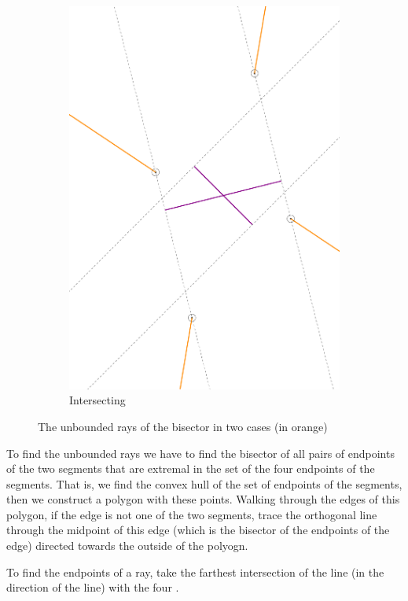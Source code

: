 \documentclass[11pt,a4paper,english]{article}
\begin{document}
\begin{figure}[h]
\begin{subfigure}[b]{0.3\textwidth}
		\includegraphics[width=\textwidth]{four_unbounded_rays}
    	\caption{Intersecting \label{fig:four_unbounded_rays}}
	\end{subfigure}
	\caption{The unbounded rays of the bisector in two cases (in orange)\label{fig:unbounded_rays}}
	\end{figure}
	
	To find the unbounded rays we have to find the bisector of all pairs of endpoints of the two segments that are extremal in the set of the four endpoints of the segments. That is, we find the convex hull of the set of endpoints of the segments, then we construct a polygon with these points. Walking through the edges of this polygon, if the edge is not one of the two segments, trace the orthogonal line through the midpoint of this edge (which is the bisector of the endpoints of the edge) directed towards the outside of the polyogn.\par
	To find the endpoints of a ray, take the farthest intersection of the line (in the direction of the line) with the four .
	
\end{document}
